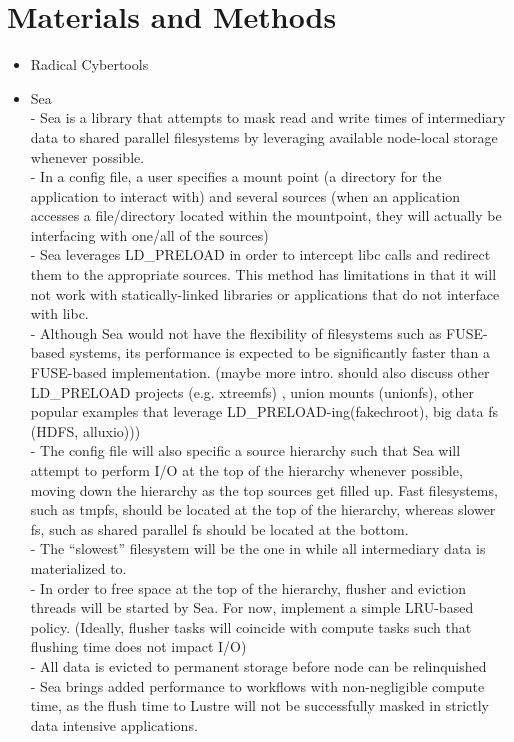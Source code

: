 \documentclass[conference]{IEEEtran}
\begin{document}
\section{Materials and Methods}
\begin{itemize}
    \item{Radical Cybertools}
    \item{Sea}
       \\ - Sea is a library that attempts to mask read and write times of intermediary data to shared parallel
        filesystems by leveraging available node-local storage whenever possible. 
        \\ - In a config file, a user specifies a mount point (a directory for the application to interact with) and several sources
        (when an application accesses a file/directory located within the mountpoint, they will actually be interfacing with one/all of the sources)
        \\ - Sea leverages LD\_PRELOAD in order to intercept libc calls and redirect them to the appropriate sources. This method has limitations in that
        it will not work with statically-linked libraries or applications that do not interface with libc.
        \\ - Although Sea would not have the flexibility of filesystems such as FUSE-based systems, its performance is expected to be significantly faster than
    a FUSE-based implementation. (maybe more intro. should also discuss other LD\_PRELOAD projects (e.g. xtreemfs) , union mounts (unionfs), other popular examples that leverage LD\_PRELOAD-ing(fakechroot), big data fs (HDFS, alluxio)))
        \\ - The config file will also specific a source hierarchy such that Sea will attempt to perform I/O at the top of the hierarchy whenever possible,
        moving down the hierarchy as the top sources get filled up. Fast filesystems, such as tmpfs, should be located at the top of the hierarchy, whereas slower
        fs, such as shared parallel fs should be located at the bottom. 
        \\ - The ``slowest'' filesystem will be the one in while all intermediary data is materialized to.
        \\ - In order to free space at the top of the hierarchy, flusher and eviction threads will be started by Sea. For now, implement a simple LRU-based policy. (Ideally, flusher tasks will coincide with compute tasks such that flushing time does not impact I/O)
        \\ - All data is evicted to permanent storage before node can be relinquished
        \\ - Sea brings added performance to workflows with non-negligible compute time, as the flush time to Lustre will not be successfully masked in strictly data intensive applications.


\end{itemize}
\end{document}

